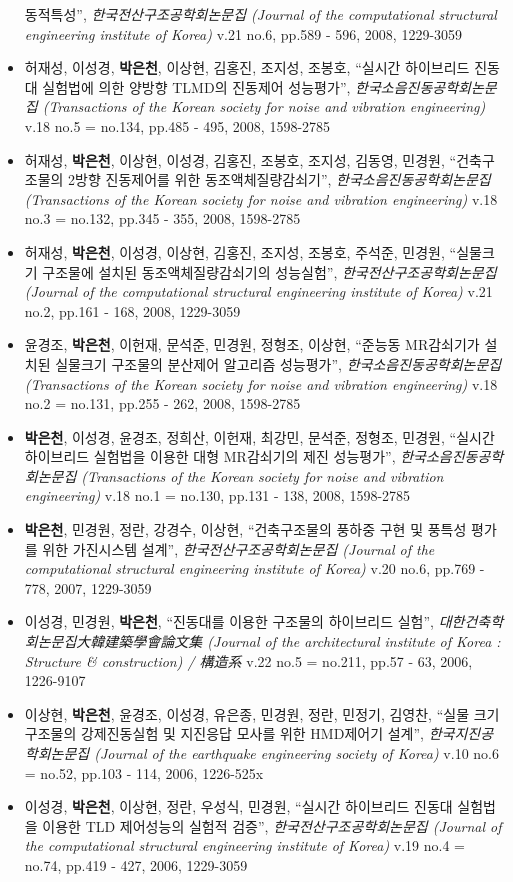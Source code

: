 \begin{itemize}
  동적특성'', \emph{한국전산구조공학회논문집 (Journal of the
  computational structural engineering institute of Korea)} v.21 no.6,
  pp.589 - 596, 2008, 1229-3059
\item
  허재성, 이성경, \textbf{박은천}, 이상현, 김홍진, 조지성, 조봉호,
  ``실시간 하이브리드 진동대 실험법에 의한 양방향 TLMD의 진동제어
  성능평가'', \emph{한국소음진동공학회논문집 (Transactions of the Korean
  society for noise and vibration engineering)} v.18 no.5 = no.134,
  pp.485 - 495, 2008, 1598-2785
\item
  허재성, \textbf{박은천}, 이상현, 이성경, 김홍진, 조봉호, 조지성,
  김동영, 민경원, ``건축구조물의 2방향 진동제어를 위한
  동조액체질량감쇠기'', \emph{한국소음진동공학회논문집 (Transactions of
  the Korean society for noise and vibration engineering)} v.18 no.3 =
  no.132, pp.345 - 355, 2008, 1598-2785
\item
  허재성, \textbf{박은천}, 이성경, 이상현, 김홍진, 조지성, 조봉호,
  주석준, 민경원, ``실물크기 구조물에 설치된 동조액체질량감쇠기의
  성능실험'', \emph{한국전산구조공학회논문집 (Journal of the
  computational structural engineering institute of Korea)} v.21 no.2,
  pp.161 - 168, 2008, 1229-3059
\item
  윤경조, \textbf{박은천}, 이헌재, 문석준, 민경원, 정형조, 이상현,
  ``준능동 MR감쇠기가 설치된 실물크기 구조물의 분산제어 알고리즘
  성능평가'', \emph{한국소음진동공학회논문집 (Transactions of the Korean
  society for noise and vibration engineering)} v.18 no.2 = no.131,
  pp.255 - 262, 2008, 1598-2785
\item
  \textbf{박은천}, 이성경, 윤경조, 정희산, 이헌재, 최강민, 문석준,
  정형조, 민경원, ``실시간 하이브리드 실험법을 이용한 대형 MR감쇠기의
  제진 성능평가'', \emph{한국소음진동공학회논문집 (Transactions of the
  Korean society for noise and vibration engineering)} v.18 no.1 =
  no.130, pp.131 - 138, 2008, 1598-2785
\item
  \textbf{박은천}, 민경원, 정란, 강경수, 이상현, ``건축구조물의 풍하중
  구현 및 풍특성 평가를 위한 가진시스템 설계'',
  \emph{한국전산구조공학회논문집 (Journal of the computational
  structural engineering institute of Korea)} v.20 no.6, pp.769 - 778,
  2007, 1229-3059
\item
  이성경, 민경원, \textbf{박은천}, ``진동대를 이용한 구조물의 하이브리드
  실험'', \emph{대한건축학회논문집大韓建築學會論文集 (Journal of the
  architectural institute of Korea : Structure \& construction) /
  構造系} v.22 no.5 = no.211, pp.57 - 63, 2006, 1226-9107
\item
  이상현, \textbf{박은천}, 윤경조, 이성경, 유은종, 민경원, 정란, 민정기,
  김영찬, ``실물 크기 구조물의 강제진동실험 및 지진응답 모사를 위한
  HMD제어기 설계'', \emph{한국지진공학회논문집 (Journal of the
  earthquake engineering society of Korea)} v.10 no.6 = no.52, pp.103 -
  114, 2006, 1226-525x
\item
  이성경, \textbf{박은천}, 이상현, 정란, 우성식, 민경원, ``실시간
  하이브리드 진동대 실험법을 이용한 TLD 제어성능의 실험적 검증'',
  \emph{한국전산구조공학회논문집 (Journal of the computational
  structural engineering institute of Korea)} v.19 no.4 = no.74, pp.419
  - 427, 2006, 1229-3059
\end{itemize}

